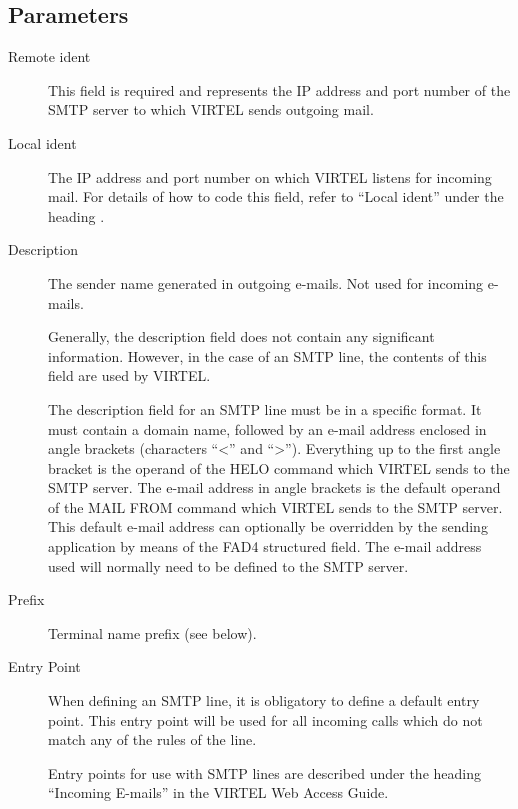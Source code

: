 \documentclass[letterpaper,10pt,english]{sphinxmanual}
\begin{document}
\subsection{Parameters}
\label{\detokenize{connectivity_guide:id3}}\label{\detokenize{connectivity_guide:index-18}}\begin{description}
\item[{Remote ident}] \leavevmode
This field is required and represents the IP address and port number of the SMTP server to which VIRTEL sends outgoing mail.

\item[{Local ident}] \leavevmode
The IP address and port number on which VIRTEL listens for incoming mail. For details of how to code this field, refer to “Local ident” under the heading {\hyperref[\detokenize{connectivity_guide:bookmark13}]{}}.

\item[{Description}] \leavevmode
The sender name generated in outgoing e-mails. Not used for incoming e-mails.

Generally, the description field does not contain any significant information. However, in the case of an SMTP line, the contents of this field are used by VIRTEL.

The description field for an SMTP line must be in a specific format. It must contain a domain name, followed by an e-mail address enclosed in angle brackets (characters “\textless{}” and “\textgreater{}”). Everything up to the first angle bracket is the operand of the HELO command which VIRTEL sends to the SMTP server. The e-mail address in angle brackets is the default operand of the MAIL FROM command which VIRTEL sends to the SMTP server. This default e-mail address can optionally be overridden by the sending application by means of the
FAD4 structured field. The e-mail address used will normally need to be defined to the SMTP server.

\item[{Prefix}] \leavevmode
Terminal name prefix (see below).

\item[{Entry Point}] \leavevmode
When defining an SMTP line, it is obligatory to define a default entry point. This entry point will be used for all incoming calls which do not match any of the rules of the line.

Entry points for use with SMTP lines are described under the heading “Incoming E-mails” in the VIRTEL Web Access Guide.


\end{description}
\end{document}
